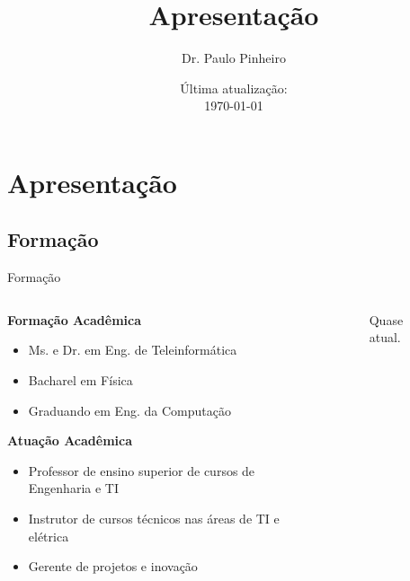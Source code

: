 \documentclass{beamer}
\title{Apresentação}
\author[Paulo Pinheiro]
{Dr. Paulo Pinheiro\inst{1}}
\institute[UNIFAP]
{
    \inst{1}
    Centro Universitário Paraíso do Ceará\\
    UNIFAP
}
\date{Última atualização:\\ \today}
\begin{document}
\begin{frame}
    \titlepage 
\end{frame}
\logo{}

\section{Apresentação}
\subsection{Formação}
\begin{frame}{Formação}
    \begin{columns}[T] %
        \begin{column}{.7\textwidth}
            \textbf{Formação Acadêmica}
            \begin{itemize}
                \item Ms. e Dr. em Eng. de Teleinformática
                \item Bacharel em Física
                \item Graduando em Eng. da Computação
            \end{itemize}
            \vspace{0.2cm}
            \textbf{Atuação Acadêmica}
            \begin{itemize}
                \item Professor de ensino superior de cursos de Engenharia e TI
                \item Instrutor de cursos técnicos nas áreas de TI e elétrica
                \item Gerente de projetos e inovação
            \end{itemize}
        \end{column}%
        \hfill%
        \begin{column}{.35\textwidth}
            \begin{figure}[t!]
                \centering
                \caption{Quase atual.}

\end{figure}
\end{column}
\end{columns}
\end{frame}
\end{document}

